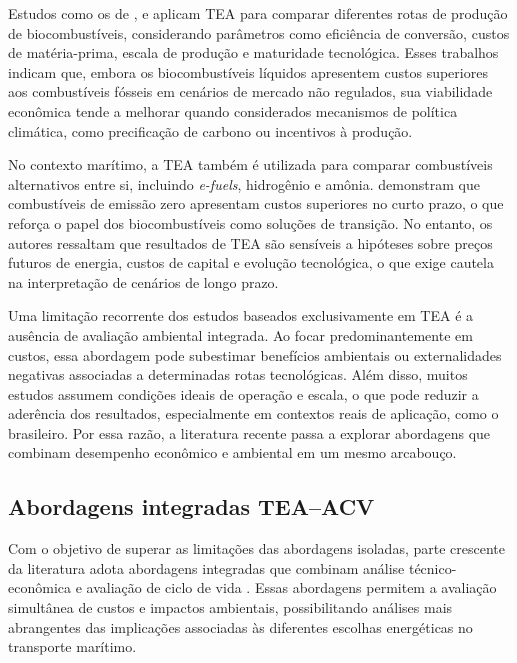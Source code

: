 Estudos como os de \citet{tan_biofuel_2021}, \citet{li_techno-economic_2022} e \citet{tan_economic_2019} aplicam \gls{TEA} para comparar diferentes rotas de produção de biocombustíveis, considerando parâmetros como eficiência de conversão, custos de matéria-prima, escala de produção e maturidade tecnológica. Esses trabalhos indicam que, embora os biocombustíveis líquidos apresentem custos superiores aos combustíveis fósseis em cenários de mercado não regulados, sua viabilidade econômica tende a melhorar quando considerados mecanismos de política climática, como precificação de carbono ou incentivos à produção.

No contexto marítimo, a \gls{TEA} também é utilizada para comparar combustíveis alternativos entre si, incluindo \emph{e-fuels}, hidrogênio e amônia. \citet{lindstad_reduction_2021} demonstram que combustíveis de emissão zero apresentam custos superiores no curto prazo, o que reforça o papel dos biocombustíveis como soluções de transição. No entanto, os autores ressaltam que resultados de \gls{TEA} são sensíveis a hipóteses sobre preços futuros de energia, custos de capital e evolução tecnológica, o que exige cautela na interpretação de cenários de longo prazo.

Uma limitação recorrente dos estudos baseados exclusivamente em \gls{TEA} é a ausência de avaliação ambiental integrada. Ao focar predominantemente em custos, essa abordagem pode subestimar benefícios ambientais ou externalidades negativas associadas a determinadas rotas tecnológicas. Além disso, muitos estudos assumem condições ideais de operação e escala, o que pode reduzir a aderência dos resultados, especialmente em contextos reais de aplicação, como o brasileiro. Por essa razão, a literatura recente passa a explorar abordagens que combinam desempenho econômico e ambiental em um mesmo arcabouço.

\subsection{Abordagens integradas TEA--ACV}
Com o objetivo de superar as limitações das abordagens isoladas, parte crescente da literatura adota abordagens integradas que combinam análise técnico-econômica e avaliação de ciclo de vida \citep{tan_biofuel_2021,li_techno-economic_2022,cesilla_de_souza_technical-economic_2024}. Essas abordagens permitem a avaliação simultânea de custos e impactos ambientais, possibilitando análises mais abrangentes das implicações associadas às diferentes escolhas energéticas no transporte marítimo.

